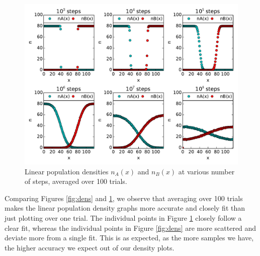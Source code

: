 \documentclass{article}
\begin{document}
\begin{figure}[H]
\centering
\includegraphics[width=12cm]{GP1_3c.pdf}
\caption{Linear population densities $n_{A}(x)$ and $n_{B}(x)$ at various number of steps, averaged over 100 trials.}
\label{fig:avgdens}
\end{figure}

\noindent Comparing Figures \ref{fig:dens} and \ref{fig:avgdens}, we observe that averaging over 100 trials makes the linear population density graphs more accurate and closely fit than just plotting over one trial. The individual points in Figure \ref{fig:avgdens} closely follow a clear fit, whereas the individual points in Figure \ref{fig:dens} are more scattered and deviate more from a single fit. This is as expected, as the more samples we have, the higher accuracy we expect out of our density plots.
\end{document}
